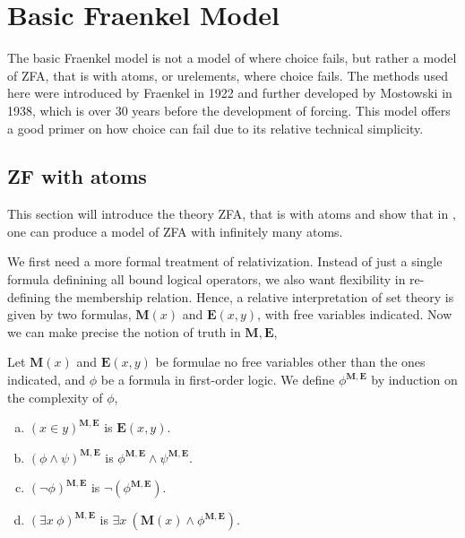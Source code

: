 \chapter{Basic Fraenkel Model}

The basic Fraenkel model is not a model of \ZF where choice fails, but rather a model of \textsf{ZFA}, that is \ZF with atoms, or urelements, where choice fails.
The methods used here were introduced by Fraenkel in 1922 and further developed by Mostowski in 1938,
which is over 30 years before the development of forcing.
This model offers a good primer on how choice can fail due to its relative technical simplicity.

\section{ZF with atoms}
\newcommand*{\M}{\mathbf{M}}
\newcommand*{\E}{\mathbf{E}}

This section will introduce the theory \textsf{ZFA}, that is \ZF with atoms and
show that in \ZFC, one can produce a model of \textsf{ZFA} with infinitely many atoms.

We first need a more formal treatment of relativization.
Instead of just a single formula definining all bound logical operators,
we also want flexibility in re-defining the membership relation.
Hence, a relative interpretation of set theory is given by two formulas,
\(\mathbf{M}(x)\) and \(\mathbf{E}(x,y)\), with free variables indicated.
Now we can make precise the notion of truth in \(\mathbf{M},\mathbf{E}\),
\begin{definition}
    Let \(\mathbf{M}(x)\) and \(\mathbf{E}(x,y)\) be formulae no free variables other than the ones indicated,
    and \(\phi\) be a formula in first-order logic. We define \(\phi^{\mathbf{M},\mathbf{E}}\) by induction on the complexity of \(\phi\),
    \begin{enumerate}[(a)]
        \item \((x\in y)^{\M,\E}\) is \(\E(x,y)\).
        \item \((\phi\land\psi)^{\M,\E}\) is \(\phi^{\M,\E}\land\psi^{\M,\E}\).
        \item \((\lnot\phi)^{\M,\E}\) is \(\lnot (\phi^{\M,\E})\).
        \item \((\exists x\ \phi)^{\M,\E}\) is \(\exists x\ (\M(x) \land \phi^{\M,\E})\).
    \end{enumerate}
\end{definition}

